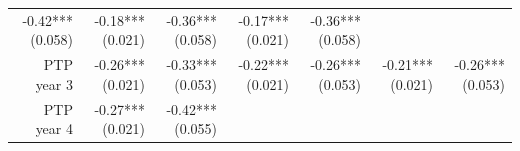 \documentclass[]{article}
\begin{document}
\begin{longtable}[c]{@{}rrrrrrr@{}}
\begin{minipage}[t]{0.12\columnwidth}\raggedleft\strut
-0.42*** (0.058)
\strut\end{minipage} &
\begin{minipage}[t]{0.11\columnwidth}\raggedleft\strut
-0.18*** (0.021)
\strut\end{minipage} &
\begin{minipage}[t]{0.12\columnwidth}\raggedleft\strut
-0.36*** (0.058)
\strut\end{minipage} &
\begin{minipage}[t]{0.11\columnwidth}\raggedleft\strut
-0.17*** (0.021)
\strut\end{minipage} &
\begin{minipage}[t]{0.11\columnwidth}\raggedleft\strut
-0.36*** (0.058)
\strut\end{minipage}\tabularnewline
\begin{minipage}[t]{0.12\columnwidth}\raggedleft\strut
PTP year 3
\strut\end{minipage} &
\begin{minipage}[t]{0.11\columnwidth}\raggedleft\strut
-0.26*** (0.021)
\strut\end{minipage} &
\begin{minipage}[t]{0.12\columnwidth}\raggedleft\strut
-0.33*** (0.053)
\strut\end{minipage} &
\begin{minipage}[t]{0.11\columnwidth}\raggedleft\strut
-0.22*** (0.021)
\strut\end{minipage} &
\begin{minipage}[t]{0.12\columnwidth}\raggedleft\strut
-0.26*** (0.053)
\strut\end{minipage} &
\begin{minipage}[t]{0.11\columnwidth}\raggedleft\strut
-0.21*** (0.021)
\strut\end{minipage} &
\begin{minipage}[t]{0.11\columnwidth}\raggedleft\strut
-0.26*** (0.053)
\strut\end{minipage}\tabularnewline
\begin{minipage}[t]{0.12\columnwidth}\raggedleft\strut
PTP year 4
\strut\end{minipage} &
\begin{minipage}[t]{0.11\columnwidth}\raggedleft\strut
-0.27*** (0.021)
\strut\end{minipage} &
\begin{minipage}[t]{0.12\columnwidth}\raggedleft\strut
-0.42*** (0.055)
\strut\end{minipage} &

\end{longtable}
\end{document}
